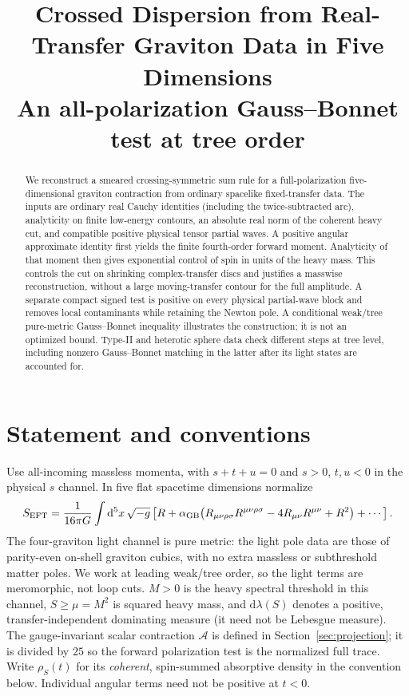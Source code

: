 \documentclass[11pt,a4paper]{article}
\title{Crossed Dispersion from Real-Transfer Graviton Data in Five Dimensions\\
\large An all-polarization Gauss--Bonnet test at tree order}
\author{}
\date{}
\theoremstyle{definition}
\theoremstyle{remark}
\newcommand{\dS}{\mathrm{d}}
\newcommand{\GB}{\alpha_{\mathrm{GB}}}
\begin{document}
\maketitle
\begin{abstract}
We reconstruct a smeared crossing-symmetric sum rule for a full-polarization five-dimensional graviton contraction from ordinary spacelike fixed-transfer data. The inputs are ordinary real Cauchy identities (including the twice-subtracted arc), analyticity on finite low-energy contours, an absolute real norm of the coherent heavy cut, and compatible positive physical tensor partial waves. A positive angular approximate identity first yields the finite fourth-order forward moment. Analyticity of that moment then gives exponential control of spin in units of the heavy mass. This controls the cut on shrinking complex-transfer discs and justifies a masswise reconstruction, without a large moving-transfer contour for the full amplitude. A separate compact signed test is positive on every physical partial-wave block and removes local contaminants while retaining the Newton pole. A conditional weak/tree pure-metric Gauss--Bonnet inequality illustrates the construction; it is not an optimized bound. Type-II and heterotic sphere data check different steps at tree level, including nonzero Gauss--Bonnet matching in the latter after its light states are accounted for.
\end{abstract}

\section{Statement and conventions}\label{sec:main}
Use all-incoming massless momenta, with $s+t+u=0$ and $s>0$, $t,u<0$ in the physical $s$ channel. In five flat spacetime dimensions normalize
\begin{equation}\label{eq:action}
 S_{\rm EFT}=\frac{1}{16\pi G}\int \dS^5x\,\sqrt{-g}
 \left[R+\GB\bigl(R_{\mu\nu\rho\sigma}R^{\mu\nu\rho\sigma}
           -4R_{\mu\nu}R^{\mu\nu}+R^2\bigr)+\cdots\right].
\end{equation}
The four-graviton light channel is pure metric: the light pole data are those of parity-even on-shell graviton cubics, with no extra massless or subthreshold matter poles. We work at leading weak/tree order, so the light terms are meromorphic, not loop cuts. $M>0$ is the heavy spectral threshold in this channel, $S\ge\mu=M^2$ is squared heavy mass, and $\dS\lambda(S)$ denotes a positive, transfer-independent dominating measure (it need not be Lebesgue measure). The gauge-invariant scalar contraction $\mathcal A$ is defined in Section~\ref{sec:projection}; it is divided by $25$ so the forward polarization test is the normalized full trace. Write $\rho_S(t)$ for its \emph{coherent}, spin-summed absorptive density in the convention below. Individual angular terms need not be positive at $t<0$.
\end{document}
